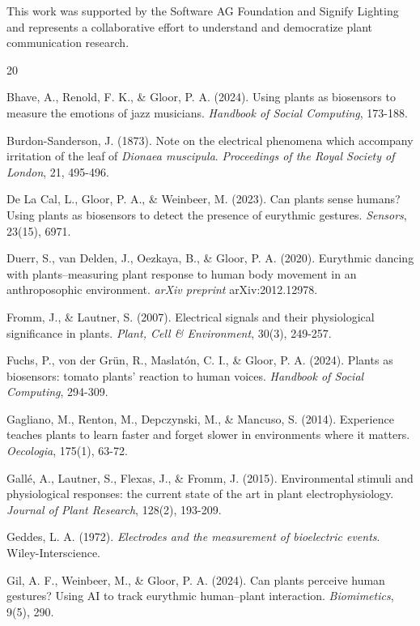 \documentclass{article}
\begin{document}
This work was supported by the Software AG Foundation and Signify Lighting and represents a collaborative effort to understand and democratize plant communication research.


\begin{thebibliography}{20}

Bhave, A., Renold, F. K., \& Gloor, P. A. (2024). Using plants as biosensors to measure the emotions of jazz musicians. \textit{Handbook of Social Computing}, 173-188.

Burdon-Sanderson, J. (1873). Note on the electrical phenomena which accompany irritation of the leaf of \textit{Dionaea muscipula}. \textit{Proceedings of the Royal Society of London}, 21, 495-496.

De La Cal, L., Gloor, P. A., \& Weinbeer, M. (2023). Can plants sense humans? Using plants as biosensors to detect the presence of eurythmic gestures. \textit{Sensors}, 23(15), 6971.

Duerr, S., van Delden, J., Oezkaya, B., \& Gloor, P. A. (2020). Eurythmic dancing with plants--measuring plant response to human body movement in an anthroposophic environment. \textit{arXiv preprint} arXiv:2012.12978.

Fromm, J., \& Lautner, S. (2007). Electrical signals and their physiological significance in plants. \textit{Plant, Cell \& Environment}, 30(3), 249-257.

Fuchs, P., von der Grün, R., Maslatón, C. I., \& Gloor, P. A. (2024). Plants as biosensors: tomato plants' reaction to human voices. \textit{Handbook of Social Computing}, 294-309.

Gagliano, M., Renton, M., Depczynski, M., \& Mancuso, S. (2014). Experience teaches plants to learn faster and forget slower in environments where it matters. \textit{Oecologia}, 175(1), 63-72.

Gallé, A., Lautner, S., Flexas, J., \& Fromm, J. (2015). Environmental stimuli and physiological responses: the current state of the art in plant electrophysiology. \textit{Journal of Plant Research}, 128(2), 193-209.

Geddes, L. A. (1972). \textit{Electrodes and the measurement of bioelectric events}. Wiley-Interscience.

Gil, A. F., Weinbeer, M., \& Gloor, P. A. (2024). Can plants perceive human gestures? Using AI to track eurythmic human--plant interaction. \textit{Biomimetics}, 9(5), 290.


\end{thebibliography}
\end{document}
